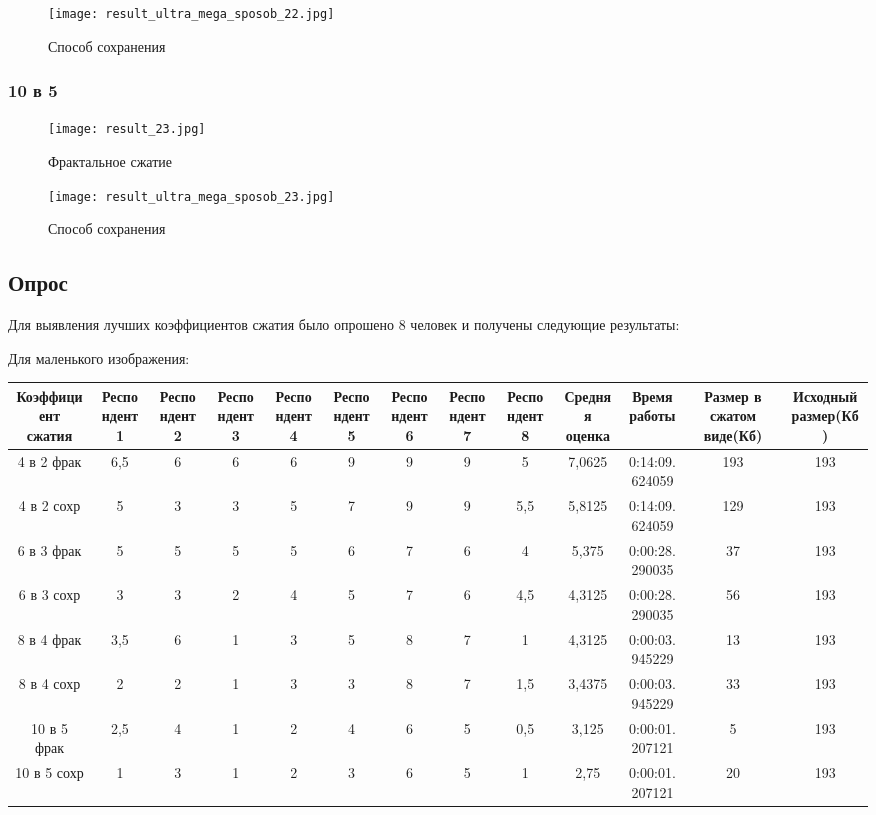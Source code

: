 \documentclass{article}
\begin{document}
\begin{figure}[h]
	\centering
	\texttt{[image: result\_ultra\_mega\_sposob\_22.jpg]}
	\caption{Способ сохранения}
	\label{fig:mpr}
\end{figure}

\subsubsection{10 в 5}
\begin{figure}[h]
	\centering
	\texttt{[image: result\_23.jpg]}
	\caption{Фрактальное сжатие}
	\label{fig:mpr}
\end{figure}

\begin{figure}[h]
	\centering
	\texttt{[image: result\_ultra\_mega\_sposob\_23.jpg]}
	\caption{Способ сохранения}
	\label{fig:mpr}
\end{figure}

\subsection{Опрос}

Для выявления лучших коэффициентов сжатия было опрошено 8 человек и получены следующие результаты:

Для маленького изображения:

\begin{center}
	\begin{tabular}{||c c c c c c c c c c c c c||} 
		\hline
		Коэффициент сжатия & Респондент 1 & Респондент 2 & Респондент 3 & Респондент 4 & Респондент 5 & Респондент 6 & Респондент 7 & Респондент 8 & Средняя оценка & Время работы & Размер в сжатом виде(Кб) & Исходный размер(Кб) \\ [0.5ex] 
		\hline\hline
		4 в 2 фрак & 6,5 & 6 & 6 & 6 & 9 & 9 & 9 & 5 & 7,0625 & 0:14:09.624059 & 193 & 193 \\ 
		\hline
		4 в 2 сохр & 5	& 3 & 3 & 5 & 7 & 9 & 9 & 5,5 &	5,8125 & 0:14:09.624059 & 129 &	193 \\
		\hline
		6 в 3 фрак & 5 & 5 & 5 & 5 & 6 & 7 & 6 & 4 &	5,375 & 0:00:28.290035 & 37 &	193 \\
		\hline
		6 в 3 сохр & 3 & 3 & 2 & 4 & 5 & 7 & 6 & 4,5 &	4,3125 & 0:00:28.290035 & 56 &	193 \\
		\hline
		8 в 4 фрак & 3,5 &	6 &	1 &	3 &	5 &	8 &	7 &	1 &	4,3125 & 0:00:03.945229 & 13 &	193 \\ 
		\hline
		8 в 4 сохр & 2 & 2 & 1 & 3 & 3 & 8 & 7 & 1,5 &	3,4375 & 0:00:03.945229 & 33 &	193 \\ 
		\hline
		10 в 5 фрак & 2,5 & 4 &	1 &	2 &	4 &	6 &	5  & 0,5 &	3,125 &	0:00:01.207121 & 5 & 193 \\ 
		\hline
		10 в 5 сохр & 1 & 3 & 1 & 2 & 3 & 6 & 5 & 1 & 2,75 & 0:00:01.207121 & 20 & 193 \\ [1ex] 
		\hline
	\end{tabular}
\end{center}
\end{document}
